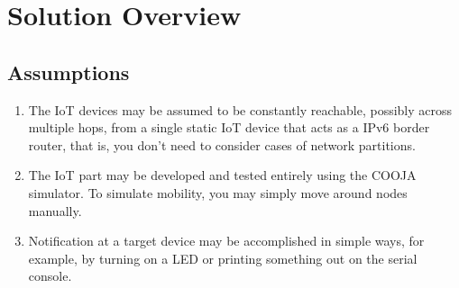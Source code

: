 \documentclass[table, 12pt]{article}
\begin{document}
\section{Solution Overview}


\subsection{Assumptions}
\begin{enumerate}[label=\textbf{A\arabic*:}]
    \item The IoT devices may be assumed to be constantly reachable, possibly across multiple hops, from a single static IoT device that acts as a IPv6 border router, that is, you don’t need to consider cases of network partitions.
    \item The IoT part may be developed and tested entirely using the COOJA simulator. To simulate mobility, you may simply move around nodes manually.
    \item Notification at a target device may be accomplished in simple ways, for example, by turning on a LED or printing something out on the serial console.
\end{enumerate}
\end{document}
